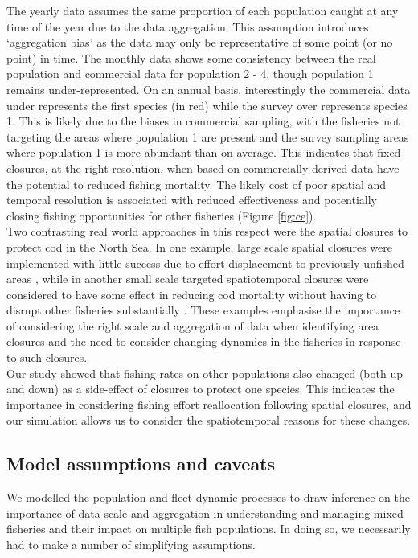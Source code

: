 \documentclass[review]{elsarticle}
\begin{document}
The yearly data assumes the same proportion of each population caught at any
time of the year due to the data aggregation. This assumption introduces
`aggregation bias' as the data may only be representative of some point (or no
point) in time. The monthly data shows some consistency between the real
population and commercial data for population 2 - 4, though population 1 remains
under-represented.  On an annual basis, interestingly the commercial data under
represents the first species (in red) while the survey over represents species
1. This is likely due to the biases in commercial sampling, with the fisheries
not targeting the areas where population 1 are present and the survey sampling
areas where population 1 is more abundant than on average. This indicates that
fixed closures, at the right resolution, when based on commercially derived
data have the potential to reduced fishing mortality. The likely cost of poor
spatial and temporal resolution is associated with reduced effectiveness and
potentially closing fishing opportunities for other fisheries (Figure
\ref{fig:ce}). \\

Two contrasting real world approaches in this respect were the spatial closures
to protect cod in the North Sea. In one example, large scale spatial closures
were implemented with little success due to effort displacement to previously
unfished areas \citep{Dinmore2003}, while in another small scale targeted
spatiotemporal closures were considered to have some effect in reducing cod
mortality without having to disrupt other fisheries substantially
\citep{Needle2011}. These examples emphasise the importance of considering the
right scale and aggregation of data when identifying area closures and the need
to consider changing dynamics in the fisheries in response to such closures. \\

Our study showed that fishing rates on other populations also changed (both up
and down) as a side-effect of closures to protect one species.  This indicates
the importance in considering fishing effort reallocation following spatial
closures, and our simulation allows us to consider the spatiotemporal reasons
for these changes.

\subsection{Model assumptions and caveats}

We modelled the population and fleet dynamic processes to draw inference on the
importance of data scale and aggregation in understanding and managing mixed
fisheries and their impact on multiple fish populations. In doing so, we
necessarily had to make a number of simplifying assumptions. \\
\end{document}
